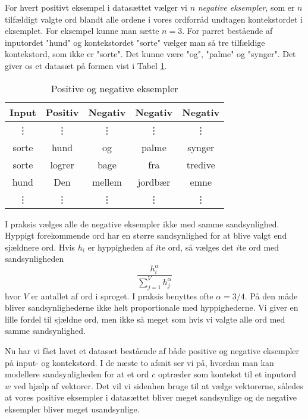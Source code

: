 \documentclass{article}
\begin{document}
For hvert positivt eksempel i datasættet vælger vi $n$ \emph{negative eksempler}, som er $n$  tilfældigt valgte ord blandt alle ordene i vores ordforråd undtagen kontekstordet i eksemplet. For eksempel kunne man sætte $n=3$. For parret bestående af inputordet "hund" og kontekstordet "sorte" vælger man så  tre tilfældige kontekstord, som ikke er "sorte". Det kunne være "og", "palme" og "synger". Det giver os et datasæt på formen vist i Tabel \ref{tab:negativ}.
\begin{table}[h]
\begin{center}
\begin{tabular}{ccccc}
{Input} & {Positiv} & Negativ & Negativ & Negativ \\
\hline
\vdots & \vdots & \vdots & \vdots &\vdots\\
sorte & hund & og & palme & synger \\
sorte & logrer & bage  & fra & tredive\\
hund & Den & mellem & jordbær & emne \\
\vdots & \vdots & \vdots & \vdots &\vdots\\
\end{tabular}
\end{center}\label{tab:negativ}
\caption{Positive og negative eksempler}
\end{table}
I praksis vælges alle de negative eksempler ikke med samme sandsynlighed. Hyppigt forekommende ord har en større sandsynlighed for at blive valgt end sjældnere ord. Hvis $h_i$ er hyppigheden af $i$te ord, så vælges det $i$te ord med sandsynligheden 
$$\frac{h_i^\alpha}{\sum_{j=1}^V h_j^\alpha}$$
hvor $V$ er antallet af ord i sproget. I praksis benyttes ofte $\alpha=3/4$. På den måde bliver sandsynlighederne ikke helt proportionale med hyppighederne. Vi giver en lille fordel til sjældne ord, men ikke så meget som hvis vi valgte alle ord med samme sandsynlighed.



Nu har vi fået lavet et datasæt bestående af både positive og negative eksempler på input- og kontekstord. I de næste to afsnit ser vi på, hvordan man kan modellere sandsynligheden for at et ord $c$ optræder som kontekst til et inputord $w$ ved hjælp af vektorer. Det vil vi sidenhen bruge til at vælge vektorerne, således at vores positive eksempler i datasættet bliver meget sandsynlige og de negative eksempler bliver meget usandsynlige. 
\end{document}
